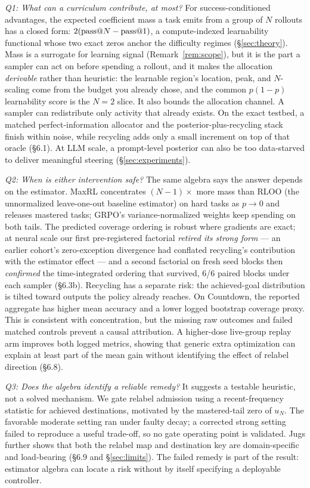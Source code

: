\emph{Q1: What can a curriculum contribute, at most?} For
success-conditioned advantages, the expected coefficient mass a task
emits from a group of $N$ rollouts has a closed form:
$2(\text{pass@}N-\text{pass@}1)$, a compute-indexed learnability functional
whose two exact zeros anchor the difficulty regimes
(\S\ref{sec:theory}).
Mass is a surrogate for learning signal (Remark~\ref{rem:scope}), but
it is the part a sampler can act on before spending a rollout, and it
makes the allocation \emph{derivable} rather than heuristic: the
learnable region's location, peak, and $N$-scaling come from the
budget you already
chose, and the common $p(1-p)$ learnability score is the $N{=}2$ slice.
It also bounds the allocation channel. A sampler can redistribute only
activity that already exists. On the exact testbed, a matched
perfect-information allocator and the posterior-plus-recycling stack
finish within noise, while recycling adds only a small increment on top
of that oracle (\S 6.1). At LLM scale, a prompt-level posterior can also
be too data-starved to deliver meaningful steering
(\S\ref{sec:experiments}).

\emph{Q2: When is either intervention safe?} The same algebra says the
answer depends on the estimator. MaxRL concentrates $(N{-}1)\times$
more mass than RLOO (the unnormalized leave-one-out baseline
estimator) on hard tasks as $p \to 0$ and releases mastered tasks;
GRPO's variance-normalized weights keep spending on both tails. The
predicted coverage ordering is robust where gradients are exact; at
neural scale our first pre-registered factorial \emph{retired its
strong form} --- an earlier cohort's zero-exception divergence had
conflated recycling's contribution with the estimator effect --- and
a second factorial on fresh seed blocks then \emph{confirmed} the
time-integrated ordering that survived, 6/6 paired blocks under each
sampler (\S 6.3b). Recycling has a separate risk: the achieved-goal
distribution is tilted toward outputs the policy already reaches. On
Countdown, the reported aggregate has higher mean accuracy and a lower
logged bootstrap coverage proxy. This is consistent with
concentration, but the missing raw outcomes and failed matched controls
prevent a causal attribution. A higher-dose live-group replay arm
improves both logged metrics, showing that generic extra optimization
can explain at least part of the mean gain without identifying the
effect of relabel direction (\S 6.8).

\emph{Q3: Does the algebra identify a reliable remedy?} It suggests a
testable heuristic, not a solved mechanism. We gate relabel admission
using a recent-frequency statistic for achieved destinations, motivated
by the mastered-tail zero of $u_N$. The favorable moderate setting ran
under faulty decay; a corrected strong setting failed to reproduce a
useful trade-off, so no gate operating point is validated. Jugs further
shows that both the relabel map and destination key are domain-specific
and load-bearing (\S 6.9 and \S\ref{sec:limits}). The failed remedy is
part of the result: estimator algebra can locate a risk without by
itself specifying a deployable controller.

